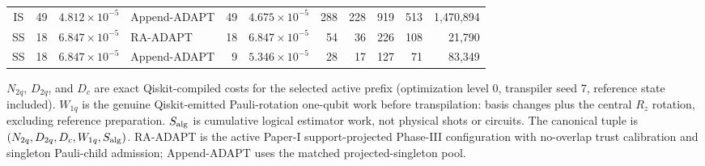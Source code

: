 \documentclass[10pt,letterpaper]{article}
\begin{document}
\begin{center}
\begin{tabular}{@{}ccc l r c rrrrr@{}}
IS & 49 & $4.812\times 10^{-5}$ & Append-ADAPT & 49 & $4.675\times 10^{-5}$ & 288 & 228 & 919 & 513 & 1,470,894 \\
\addlinespace[1.5pt]
SS & 18 & $6.847\times 10^{-5}$ & RA-ADAPT & 18 & $6.847\times 10^{-5}$ & 54 & 36 & 226 & 108 & 21,790 \\
SS & 18 & $6.847\times 10^{-5}$ & Append-ADAPT & 9 & $5.346\times 10^{-5}$ & 28 & 17 & 127 & 71 & 83,349 \\
\bottomrule
\end{tabular}
\par\vspace{4pt}
\begin{minipage}{0.96\textwidth}
\footnotesize
$N_{2q}$, $D_{2q}$, and $D_c$ are exact Qiskit-compiled costs for the
selected active prefix (optimization level 0, transpiler seed 7, reference
state included). $W_{1q}$ is the genuine Qiskit-emitted Pauli-rotation
one-qubit work before transpilation: basis changes plus the central
$R_z$ rotation, excluding reference preparation. $S_{\rm alg}$ is cumulative
logical estimator work, not physical shots or circuits. The canonical tuple is
$(N_{2q},D_{2q},D_c,W_{1q},S_{\rm alg})$. RA-ADAPT is the active Paper-I support-projected
Phase-III configuration with no-overlap trust calibration and singleton
Pauli-child admission; Append-ADAPT uses the matched projected-singleton pool.
\end{minipage}
\end{center}
\end{document}
